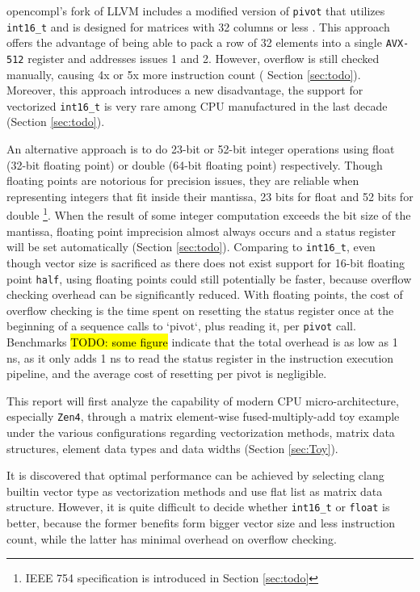 \documentclass[logo,bsc,singlespacing,parskip]{infthesis}
\begin{document}
opencompl’s fork of LLVM includes a modified version of \texttt{pivot} that
utilizes \texttt{int16\_t} and is designed for matrices with 32 columns or less \cite{FPL2}.
This approach offers the advantage of being able to pack a row of 32 elements
into a single \texttt{AVX-512} register and addresses issues 1 and 2. However,
overflow is still checked manually, causing 4x or 5x more instruction count (
Section \ref{sec:todo}). Moreover, this approach introduces a new disadvantage,
the support for vectorized \texttt{int16\_t} is very rare among CPU manufactured
in the last decade (Section \ref{sec:todo}). 

An alternative approach is to do 23-bit or 52-bit integer operations using float
(32-bit floating point) or double (64-bit floating point) respectively. Though
floating points are notorious for precision issues, they are reliable when
representing integers that fit inside their mantissa, 23 bits for float and 52
bits for double \footnote{ IEEE 754 specification is introduced in Section
\ref{sec:todo}}. When the result of some integer computation exceeds the bit
size of the mantissa, floating point imprecision almost always occurs and a
status register will be set automatically (Section \ref{sec:todo}). Comparing to
\texttt{int16\_t}, even though vector size is sacrificed as there does not exist
support for 16-bit floating point \texttt{half}, using floating points could
still potentially be faster, because overflow checking overhead can be
significantly reduced. With floating points, the cost of overflow checking is
the time spent on resetting the status register once at the beginning of a
sequence calls to `pivot`, plus reading it, per \texttt{pivot} call. Benchmarks
\hl{TODO: some figure} indicate that the total overhead is as low as 1 ns, as it
only adds 1 ns to read the status register in the instruction execution
pipeline, and the average cost of resetting per pivot is negligible. 

This report will first analyze the capability of modern CPU micro-architecture,
especially \texttt{Zen4}, through a matrix element-wise fused-multiply-add toy
example under the various configurations regarding vectorization methods, matrix
data structures, element data types and data widths (Section \ref{sec:Toy}). 

It is discovered that optimal performance can be achieved by selecting clang
builtin vector type as vectorization methods and use flat list as matrix data
structure. However, it is quite difficult to decide whether \texttt{int16\_t} or
\texttt{float} is better, because the former benefits form bigger vector size
and less instruction count, while the latter has minimal overhead on overflow
checking. 
\end{document}
